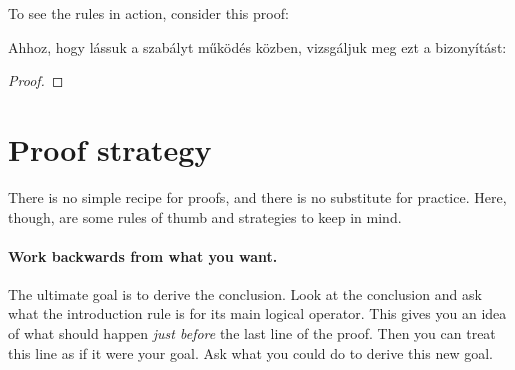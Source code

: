 
To see the rules in action, consider this proof:

Ahhoz, hogy lássuk a szabályt működés közben, vizsgáljuk meg ezt a bizonyítást:

\begin{proof}
	\open
	\close
\end{proof}


\section{Proof strategy}

There is no simple recipe for proofs, and there is no substitute for practice. Here, though, are some rules of thumb and strategies to keep in mind.

\paragraph{Work backwards from what you want.}
The ultimate goal is to derive the conclusion. Look at the conclusion and ask what the introduction rule is for its main logical operator. This gives you an idea of what should happen \emph{just before} the last line of the proof. Then you can treat this line as if it were your goal. Ask what you could do to derive this new goal.

